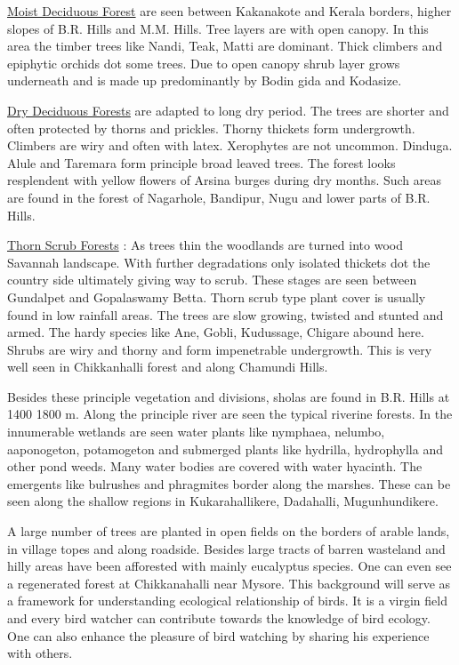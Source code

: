 \underline{Moist Deciduous Forest} are seen between Kakanakote and
Kerala borders, higher slopes of B.R. Hills and M.M. Hills. Tree 
layers are with open canopy. In this area the timber trees like 
Nandi, Teak, Matti are dominant. Thick climbers and epiphytic 
orchids dot some trees. Due to open canopy shrub layer grows 
underneath and is made up predominantly by Bodin gida and Kodasize. 

\underline{Dry Deciduous Forests} are adapted to long dry period. The 
trees are shorter and often protected by thorns and prickles. 
Thorny thickets form undergrowth. Climbers are wiry and often 
with latex. Xerophytes are not uncommon. Dinduga. Alule and 
Taremara form principle broad leaved trees. The forest looks 
resplendent with yellow flowers of Arsina burges during dry 
months. Such areas are found in the forest of Nagarhole, Bandipur, 
Nugu and lower parts of B.R. Hills. 

\underline{Thorn Scrub Forests} : As trees thin the woodlands are turned 
into wood Savannah landscape. With further degradations only isolated 
thickets dot the country side ultimately giving way to 
scrub. These stages are seen between Gundalpet and Gopalaswamy 
Betta. Thorn scrub type plant cover is usually found in low 
rainfall areas. The trees are slow growing, twisted and stunted 
and armed. The hardy species like Ane, Gobli, Kudussage, Chigare 
abound here. Shrubs are wiry and thorny and form impenetrable 
undergrowth. This is very well seen in Chikkanhalli forest and 
along Chamundi Hills. 

Besides these principle vegetation and divisions, sholas are 
found in B.R. Hills at 1400 1800 m. Along the principle river 
are seen the typical riverine forests. In the innumerable wetlands 
are seen water plants like nymphaea, nelumbo, aaponogeton, 
potamogeton and submerged plants like hydrilla, hydrophylla and 
other pond weeds. Many water bodies are covered with water hyacinth. 
The emergents like bulrushes and phragmites border along 
the marshes. These can be seen along the shallow regions in 
Kukarahallikere, Dadahalli, Mugunhundikere. 

A large number of trees are planted in open fields on the 
borders of arable lands, in village topes and along roadside. Besides 
large tracts of barren wasteland and hilly areas have been 
afforested with mainly eucalyptus species. One can even see a 
regenerated forest at Chikkanahalli near Mysore. This background 
will serve as a framework for understanding ecological relationship 
of birds. It is a virgin field and every bird watcher can 
contribute towards the knowledge of bird ecology. One can also 
enhance the pleasure of bird watching by sharing his experience 
with others. 

